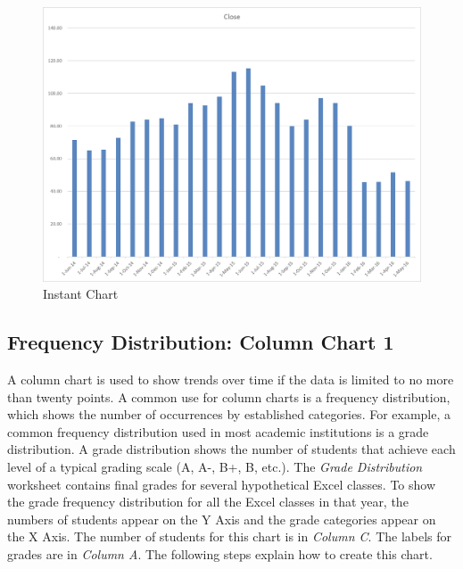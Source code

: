 \begin{figure}[H]
	\centering
	\includegraphics[width=\maxwidth{.95\linewidth}]{gfx/ch04_fig12}
	\caption{Instant Chart}
	\label{04:fig12}
\end{figure}

\subsection{Frequency Distribution: Column Chart 1}

A column chart is used to show trends over time if the data is limited to no more than twenty points. A common use for column charts is a frequency distribution, which shows the number of occurrences by established categories. For example, a common frequency distribution used in most academic institutions is a grade distribution. A grade distribution shows the number of students that achieve each level of a typical grading scale (A, A-, B+, B, etc.). The \textit{Grade Distribution} worksheet contains final grades for several hypothetical Excel classes. To show the grade frequency distribution for all the Excel classes in that year, the numbers of students appear on the Y Axis and the grade categories appear on the X Axis. The number of students for this chart is in \textit{Column C}. The labels for grades are in \textit{Column A}. The following steps explain how to create this chart.

